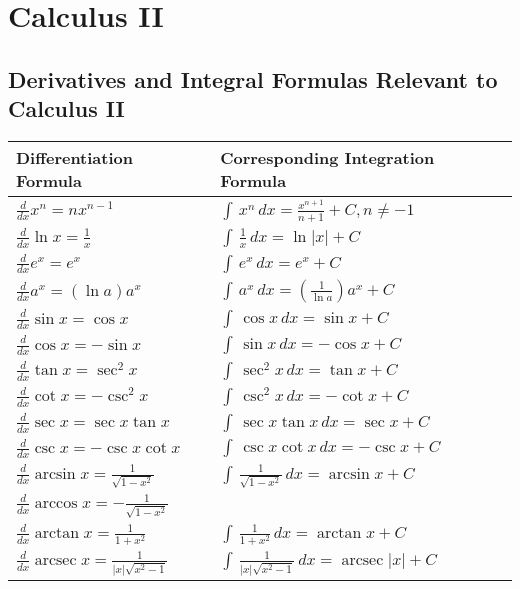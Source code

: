 \chapter{Calculus II}

\section{Derivatives and Integral Formulas Relevant to Calculus II}

\begin{table}[h]
  \centering
  \renewcommand{\arraystretch}{2}
  \begin{tabular}{p{5cm}p{7cm}}
  \toprule
  \textbf{Differentiation Formula} 
  & \textbf{Corresponding Integration Formula}\\ \hline
  $\frac{d}{dx}x^n = nx^{n-1}$ 
  & $\int \, x^n \, dx = \frac{x^{n+1}}{n+1} + C, n \neq -1$ \\ 
  \hline
  $\frac{d}{dx} \ln x = \frac{1}{x}$ 
  & $\int \, \frac{1}{x} \, dx = \ln |x| + C$\\
  \hline
  $\frac{d}{dx} e^x = e^x$ & $\int \, e^x \, dx = e^x + C$\\
  \hline
  $\frac{d}{dx} a^x = (\ln a)a^x$ 
  & $\int \, a^x \, dx = \left(\frac{1}{\ln a}\right)a^x + C$\\
  \hline
  $\frac{d}{dx} \sin x = \cos x$ & $\int \, \cos x \, dx = \sin x + C$\\
  \hline
  $\frac{d}{dx} \cos x = -\sin x$ & $\int \, \sin x \, dx = -\cos x + C$\\
  \hline
  $\frac{d}{dx} \tan x = \sec^2 x$ & $\int \, \sec^2x \, dx = \tan x + C$\\
  \hline
  $\frac{d}{dx} \cot x = -\csc^2 x$ & $\int \, \csc^2x \, dx = -\cot x + C$\\
  \hline
  $\frac{d}{dx} \sec x = \sec x \tan x$ 
  & $\int \, \sec x \tan x \, dx = \sec x + C$\\
  \hline
  $\frac{d}{dx} \csc x = -\csc x \cot x$ 
  & $\int \, \csc x \cot x \, dx = -\csc x + C$\\
  \hline
  $\frac{d}{dx} \arcsin x = \frac{1}{\sqrt{1-x^2}}$ 
  & $\int \, \frac{1}{\sqrt{1-x^2}} \, dx = \arcsin x + C$\\
  \hline
  $\frac{d}{dx} \arccos x = -\frac{1}{\sqrt{1-x^2}}$ 
   & \\ %
  \hline
  $\frac{d}{dx} \arctan x = \frac{1}{1+x^2}$ 
  & $\int \, \frac{1}{1+x^2} \, dx = \arctan x + C$\\
  \hline
  $\frac{d}{dx} \operatorname{arcsec} x = \frac{1}{|x|\sqrt{x^2-1}}$ 
  & $\int \, \frac{1}{|x|\sqrt{x^2-1}} \, 
  dx = \operatorname{arcsec} |x| + C$\\ \bottomrule
  \end{tabular}
  \end{table}


